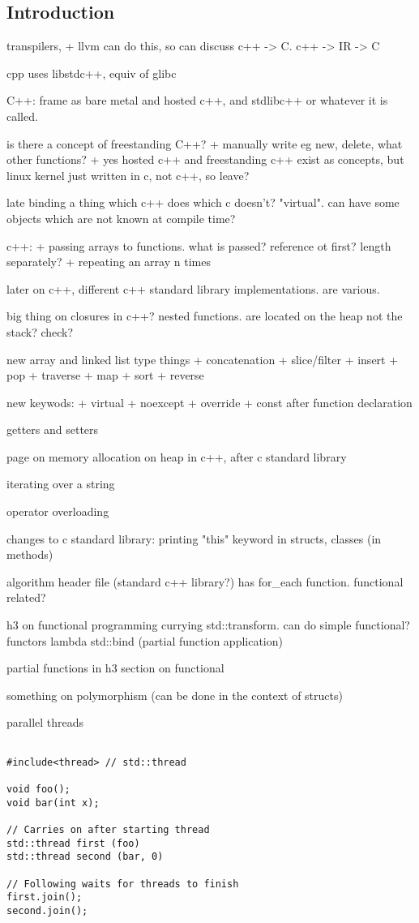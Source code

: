 
\subsection{Introduction}

transpilers,
+ llvm can do this, so can discuss c++ -> C. c++ -> IR -> C

cpp uses libstdc++, equiv of glibc

C++:
frame as bare metal and hosted c++, and stdlibc++ or whatever it is called.

is there a concept of freestanding C++?
+ manually write eg new, delete, what other functions?
+ yes hosted c++ and freestanding c++ exist as concepts, but linux kernel just written in c, not c++, so leave?

late binding a thing which c++ does which c doesn't? "virtual". can have some objects which are not known at compile time?

c++:
+ passing arrays to functions. what is passed? reference ot first? length separately?
+ repeating an array n times

later on c++, different c++ standard library implementations. are various.

big thing on closures in c++? nested functions. are located on the heap not the stack? check?

new array and linked list type things
+ concatenation
+ slice/filter
+ insert
+ pop
+ traverse
+ map
+ sort
+ reverse

new keywods:
+ virtual
+ noexcept
+ override
+ const after function declaration

getters and setters

page on memory allocation on heap in c++, after c standard library

iterating over a string

operator overloading

changes to c standard library: printing
"this" keyword in structs, classes (in methods)

algorithm header file (standard c++ library?) has for\_each function. functional related?

h3 on functional programming
currying
std::transform. can do simple functional?
functors
lambda
std::bind (partial function application)

partial functions in h3 section on functional

something on polymorphism (can be done in the context of structs)

parallel threads
\begin{verbatim}

#include<thread> // std::thread

void foo();
void bar(int x);

// Carries on after starting thread
std::thread first (foo)
std::thread second (bar, 0)

// Following waits for threads to finish
first.join();
second.join();
\end{verbatim}

